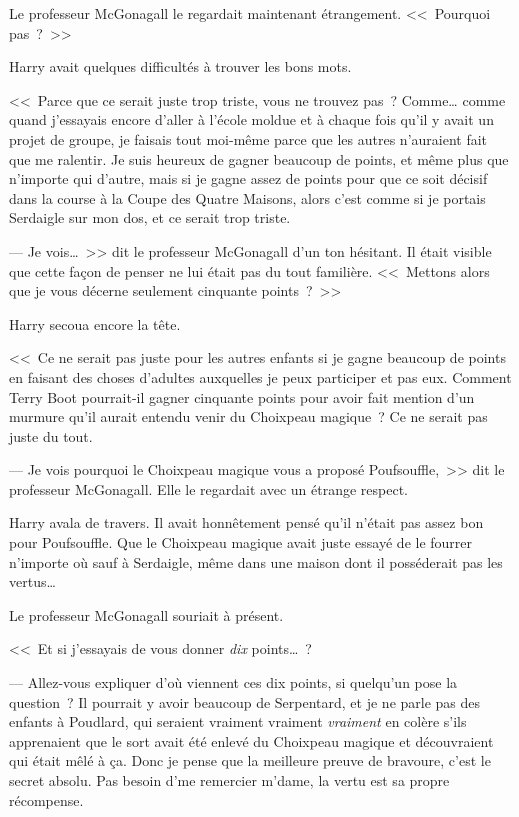 Le professeur McGonagall le regardait maintenant étrangement. <<~Pourquoi pas~?~>>

Harry avait quelques difficultés à trouver les bons mots.

<<~Parce que ce serait juste trop triste, vous ne trouvez pas~? Comme… comme quand j'essayais encore d'aller à l'école moldue et à chaque fois qu'il y avait un projet de groupe, je faisais tout moi-même parce que les autres n'auraient fait que me ralentir. Je suis heureux de gagner beaucoup de points, et même plus que n'importe qui d'autre, mais si je gagne assez de points pour que ce soit décisif dans la course à la Coupe des Quatre Maisons, alors c'est comme si je portais Serdaigle sur mon dos, et ce serait trop triste.

--- Je vois…~>> dit le professeur McGonagall d'un ton hésitant. Il était visible que cette façon de penser ne lui était pas du tout familière. <<~Mettons alors que je vous décerne seulement cinquante points~?~>>

Harry secoua encore la tête.

<<~Ce ne serait pas juste pour les autres enfants si je gagne beaucoup de points en faisant des choses d'adultes auxquelles je peux participer et pas eux. Comment Terry Boot pourrait-il gagner cinquante points pour avoir fait mention d'un murmure qu'il aurait entendu venir du Choixpeau magique~? Ce ne serait pas juste du tout.

--- Je vois pourquoi le Choixpeau magique vous a proposé Poufsouffle,~>> dit le professeur McGonagall. Elle le regardait avec un étrange respect.

Harry avala de travers. Il avait honnêtement pensé qu'il n'était pas assez bon pour Poufsouffle. Que le Choixpeau magique avait juste essayé de le fourrer n'importe où sauf à Serdaigle, même dans une maison dont il posséderait pas les vertus…

Le professeur McGonagall souriait à présent.

<<~Et si j'essayais de vous donner \emph{dix} points…~?

--- Allez-vous expliquer d'où viennent ces dix points, si quelqu'un pose la question~? Il pourrait y avoir beaucoup de Serpentard, et je ne parle pas des enfants à Poudlard, qui seraient vraiment vraiment \emph{vraiment} en colère s'ils apprenaient que le sort avait été enlevé du Choixpeau magique et découvraient qui était mêlé à ça. Donc je pense que la meilleure preuve de bravoure, c'est le secret absolu. Pas besoin d'me remercier m'dame, la vertu est sa propre récompense.

